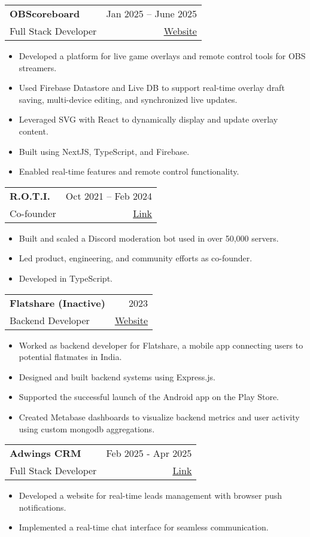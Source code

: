 \documentclass[A4,11pt]{article}
\makeatletter
\newcommand{\CVItem}[1]{
  \item\small{
    {#1 \vspace{-2pt}}
  }
}
\newcommand{\CVSubheading}[4]{
  \vspace{-2pt}\item
    \begin{tabular*}{0.97\textwidth}[t]{l@{\extracolsep{\fill}}r}
      \textbf{#1} & #2 \\
      \small#3 & \small #4 \\
    \end{tabular*}\vspace{-7pt}
}
\newcommand{\CVItemListStart}{\begin{itemize}}
\newcommand{\CVItemListEnd}{\end{itemize}\vspace{-5pt}}
\makeatother
\begin{document}
    \CVSubheading
      {OBScoreboard}{Jan 2025 -- June 2025}
      {Full Stack Developer}{\href{https://app.obscoreboard.com/}{\underline{\color{blue} Website}}}
      \CVItemListStart
        \CVItem{Developed a platform for live game overlays and remote control tools for OBS streamers.}
        \CVItem{Used Firebase Datastore and Live DB to support real-time overlay draft saving, multi-device editing, and synchronized live updates.}
        \CVItem{Leveraged SVG with React to dynamically display and update overlay content.}
        \CVItem{Built using NextJS, TypeScript, and Firebase.}
        \CVItem{Enabled real-time features and remote control functionality.}
      \CVItemListEnd

      \CVSubheading
        {R.O.T.I.}{Oct 2021 -- Feb 2024}
        {Co-founder}{\href{https://rotibot.xyz/}{\underline{\color{blue} Link}}}
        \CVItemListStart
          \CVItem{Built and scaled a Discord moderation bot used in over 50,000 servers.}
          \CVItem{Led product, engineering, and community efforts as co-founder.}
          \CVItem{Developed in TypeScript.}
        \CVItemListEnd

    \CVSubheading
      {Flatshare (Inactive)}{2023}
      {Backend Developer}{\href{https://joinflatshare.com/}{\underline{\color{blue} Website}}}
      \CVItemListStart
        \CVItem{Worked as backend developer for Flatshare, a mobile app connecting users to potential flatmates in India.}
        \CVItem{Designed and built backend systems using Express.js.}
        \CVItem{Supported the successful launch of the Android app on the Play Store.}
        \CVItem{Created Metabase dashboards to visualize backend metrics and user activity using custom mongodb aggregations.}
      \CVItemListEnd


      \CVSubheading
        {Adwings CRM}{Feb 2025 - Apr 2025}
        {Full Stack Developer}{\href{https://adwingscrm.com/}{\underline{\color{blue} Link}}}
        \CVItemListStart
          \CVItem{Developed a website for real-time leads management with browser push notifications.}
          \CVItem{Implemented a real-time chat interface for seamless communication.}
        \CVItemListEnd
\end{document}
